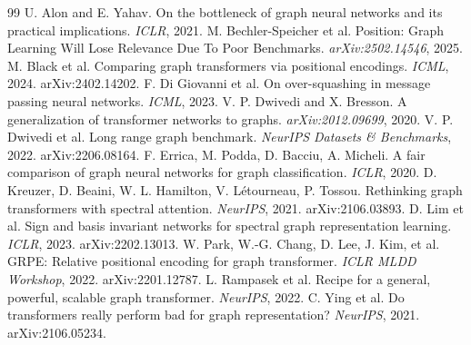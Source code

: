 \documentclass[10pt]{article}
\begin{document}
\begin{thebibliography}{99}
\footnotesize
{} U. Alon and E. Yahav. On the bottleneck of graph neural networks and its practical implications. \emph{ICLR}, 2021.
 M. Bechler-Speicher et al. Position: Graph Learning Will Lose Relevance Due To Poor Benchmarks. \emph{arXiv:2502.14546}, 2025.
 M. Black et al. Comparing graph transformers via positional encodings. \emph{ICML}, 2024. arXiv:2402.14202.
 F. Di Giovanni et al. On over-squashing in message passing neural networks. \emph{ICML}, 2023.
 V. P. Dwivedi and X. Bresson. A generalization of transformer networks to graphs. \emph{arXiv:2012.09699}, 2020.
 V. P. Dwivedi et al. Long range graph benchmark. \emph{NeurIPS Datasets \& Benchmarks}, 2022. arXiv:2206.08164.
 F. Errica, M. Podda, D. Bacciu, A. Micheli. A fair comparison of graph neural networks for graph classification. \emph{ICLR}, 2020.
 D. Kreuzer, D. Beaini, W. L. Hamilton, V. L\'etourneau, P. Tossou. Rethinking graph transformers with spectral attention. \emph{NeurIPS}, 2021. arXiv:2106.03893.
 D. Lim et al. Sign and basis invariant networks for spectral graph representation learning. \emph{ICLR}, 2023. arXiv:2202.13013.
 W. Park, W.-G. Chang, D. Lee, J. Kim, et al. GRPE: Relative positional encoding for graph transformer. \emph{ICLR MLDD Workshop}, 2022. arXiv:2201.12787.
 L. Rampasek et al. Recipe for a general, powerful, scalable graph transformer. \emph{NeurIPS}, 2022.
 C. Ying et al. Do transformers really perform bad for graph representation? \emph{NeurIPS}, 2021. arXiv:2106.05234.
\end{thebibliography}
\end{document}
